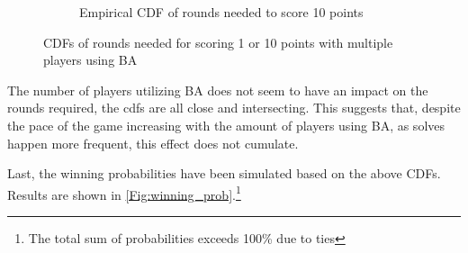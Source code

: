 \documentclass{article}
\begin{document}
\begin{figure}[H]
\begin{subfigure}{0.45\textwidth}
        \caption{Empirical CDF of rounds needed to score 10 points}
    \end{subfigure}

    \caption{CDFs of rounds needed for scoring 1 or 10 points with multiple players using BA} 
    \label{fig:cdf_multiple}
\end{figure}

The number of players utilizing BA does not seem to have an impact on the rounds required, the cdfs are all close and intersecting. This suggests that, despite the pace of the game increasing with the amount of players using BA, as solves happen more frequent, this effect does not cumulate.

Last, the winning probabilities have been simulated based on the above CDFs. Results are shown in \cref{Fig:winning_prob}.\footnote{The total sum of probabilities exceeds 100\% due to ties}
\end{document}
